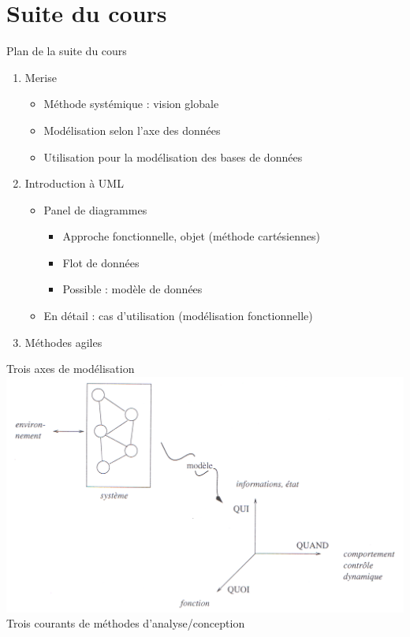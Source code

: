 \documentclass[14pt]{beamer}
\begin{document}
\section{Suite du cours}

\begin{framentitle}{Plan de la suite du cours}
    \begin{enumerate}
        \item Merise
            \begin{itemize}
                \item Méthode systémique : vision globale
                \item Modélisation selon l'axe des données
                \item Utilisation pour la modélisation des bases de données
            \end{itemize}
        \item Introduction à UML
            \begin{itemize}
                \item Panel de diagrammes
                    \begin{itemize}
                        \item Approche fonctionnelle, objet (méthode cartésiennes)
                        \item Flot de données
                        \item Possible : modèle de données
                    \end{itemize}
                \item En détail : cas d'utilisation (modélisation fonctionnelle)
            \end{itemize}
        \item Méthodes agiles
    \end{enumerate}
\end{framentitle}

\begin{framentitle}{Trois axes de modélisation}
    \includegraphics[width=\textwidth]{fig2.png}
    \rae Trois courants de méthodes d'analyse/conception
\end{framentitle}
\end{document}
